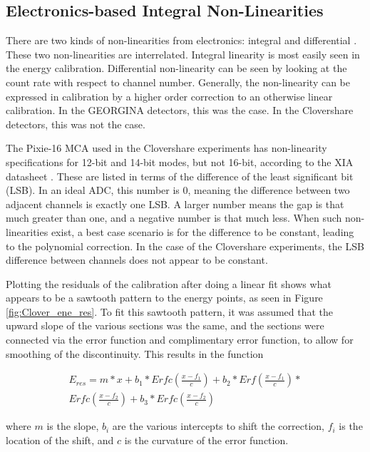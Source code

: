 \subsection{Electronics-based Integral Non-Linearities}
\label{sec:non-linearity}

There are two kinds of non-linearities from electronics: integral and differential \citep{knoll00:rad_det_meas}. These two non-linearities are interrelated. Integral linearity is most easily seen in the energy calibration. Differential non-linearity can be seen by looking at the count rate with respect to channel number. Generally, the non-linearity can be expressed in calibration by a higher order correction to an otherwise linear calibration. In the GEORGINA detectors, this was the case. In the Clovershare detectors, this was not the case. 

The Pixie-16 MCA used in the Clovershare experiments has non-linearity specifications for 12-bit and 14-bit modes, but not 16-bit, according to the XIA datasheet \citep{xia:_pixie}. These are listed in terms of the difference of the least significant bit (LSB). In an ideal ADC, this number is 0, meaning the difference between two adjacent channels is exactly one LSB. A larger number means the gap is that much greater than one, and a negative number is that much less. When such non-linearities exist, a best case scenario is for the difference to be constant, leading to the polynomial correction. In the case of the Clovershare experiments, the LSB difference between channels does not appear to be constant.

Plotting the residuals of the calibration after doing a linear fit shows what appears to be a sawtooth pattern to the energy points, as seen in Figure \ref{fig:Clover_ene_res}. To fit this sawtooth pattern, it was assumed that the upward slope of the various sections was the same, and the sections were connected via the error function and complimentary error function, to allow for smoothing of the discontinuity. This results in the function

\begin{equation}
    \begin{aligned}
    	E_{res}= m*x+b_1*Erfc\left(\frac{x-f_1}{c}\right)+b_2*Erf\left(\frac{x-f_1}{c}\right)*\\Erfc\left(\frac{x-f_2}{c}\right)+b_3*Erfc\left(\frac{x-f_2}{c}\right)
    \end{aligned}
\end{equation}

where $m$ is the slope, $b_i$ are the various intercepts to shift the correction, $f_i$ is the location of the shift, and $c$ is the curvature of the error function.

